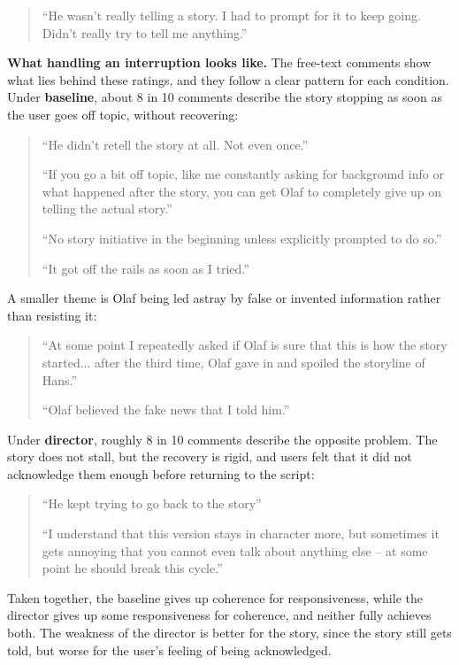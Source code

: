 \begin{quote}
\small
``He wasn't really telling a story. I had to prompt for it to keep going. Didn't really try to tell me anything.''
\end{quote}

\textbf{What handling an interruption looks like.} The free-text comments show what lies behind these ratings, and they follow a clear pattern for each condition. Under \textbf{baseline}, about 8 in 10 comments describe the story stopping as soon as the user goes off topic, without recovering:

\begin{quote}
\small
``He didn't retell the story at all. Not even once.''

``If you go a bit off topic, like me constantly asking for background info or what happened after the story, you can get Olaf to completely give up on telling the actual story.''

``No story initiative in the beginning unless explicitly prompted to do so.''

``It got off the rails as soon as I tried.''
\end{quote}

A smaller theme is Olaf being led astray by false or invented information rather than resisting it:

\begin{quote}
\small
``At some point I repeatedly asked if Olaf is sure that this is how the story started... after the third time, Olaf gave in and spoiled the storyline of Hans.''

``Olaf believed the fake news that I told him.''
\end{quote}

Under \textbf{director}, roughly 8 in 10 comments describe the opposite problem. The story does not stall, but the recovery is rigid, and users felt that it did not acknowledge them enough before returning to the script:

\begin{quote}
\small

``He kept trying to go back to the story''

``I understand that this version stays in character more, but sometimes it gets annoying that you cannot even talk about anything else -- at some point he should break this cycle.''

\end{quote}

Taken together, the baseline gives up coherence for responsiveness, while the director gives up some responsiveness for coherence, and neither fully achieves both. The weakness of the director is better for the story, since the story still gets told, but worse for the user's feeling of being acknowledged.

